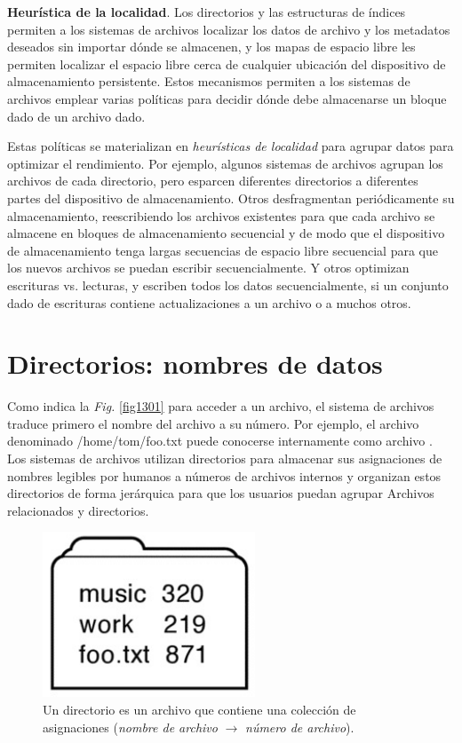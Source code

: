 \documentclass[10pt]{book}
\begin{document}
\textbf{Heurística de la localidad}. Los directorios y las estructuras de índices permiten a los sistemas de archivos localizar los datos de archivo y los metadatos deseados sin importar dónde se almacenen, y los mapas de espacio libre les permiten localizar el espacio libre cerca de cualquier ubicación del dispositivo de almacenamiento persistente. Estos mecanismos permiten a los sistemas de archivos emplear varias políticas para decidir dónde debe almacenarse un bloque dado de un archivo dado.

Estas políticas se materializan en \textit{heurísticas de localidad} para agrupar datos para optimizar el rendimiento. Por ejemplo, algunos sistemas de archivos agrupan los archivos de cada directorio, pero esparcen diferentes directorios a diferentes partes del dispositivo de almacenamiento. Otros desfragmentan periódicamente su almacenamiento, reescribiendo los archivos existentes para que cada archivo se almacene en bloques de almacenamiento secuencial y de modo que el dispositivo de almacenamiento tenga largas secuencias de espacio libre secuencial para que los nuevos archivos se puedan escribir secuencialmente. Y otros optimizan escrituras vs. lecturas, y escriben todos los datos secuencialmente, si un conjunto dado de escrituras contiene actualizaciones a un archivo o a muchos otros.

\section{Directorios: nombres de datos}
Como indica la \textit{Fig.} \ref{fig1301} para acceder a un archivo, el sistema de archivos traduce primero el nombre del archivo a su número. Por ejemplo, el archivo denominado {\mf /home/tom/foo.txt} puede conocerse internamente como archivo {}. Los sistemas de archivos utilizan directorios para almacenar sus asignaciones de nombres legibles por humanos a números de archivos internos y organizan estos directorios de forma jerárquica para que los usuarios puedan agrupar Archivos relacionados y directorios.

\begin{figure}[tbhp]
\centerline{\includegraphics[scale=0.45]{img/fig1302}}
\caption{Un directorio es un archivo que contiene una colección de asignaciones (\textit{nombre de archivo} $\rightarrow$ \textit{número de archivo}).}
\label{fig1302}
\end{figure}
\end{document}
